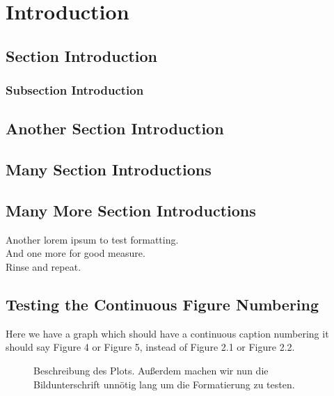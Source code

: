 \glsresetall%
\chapter{Introduction}%
\blindtext%
%
%
\section{Section Introduction}%
\blindtext%
%
%
\subsection{Subsection Introduction}%
\blindtext%
%
%
\section{Another Section Introduction}%
\blindtext%
%
%
\section{Many Section Introductions}%
\blindtext%
%
%
\section{Many More Section Introductions}%
\blindtext%
Another lorem ipsum to test formatting. \\%
\blindtext%
And one more for good measure.\\%
\blindtext%
Rinse and repeat. \\%
\blindtext[3]%
\section{Testing the Continuous Figure Numbering}%
Here we have a graph which should have a continuous caption numbering \ie it should say Figure 4 or Figure 5, instead of Figure 2.1 or Figure 2.2.
\begin{figure}[htb]%
	\centering%
	\caption{Beschreibung des Plots. Außerdem machen wir nun die Bildunterschrift unnötig lang um die Formatierung zu testen. \label{fig:PlotThreeDimTEst}}%
\end{figure}%
%
%
